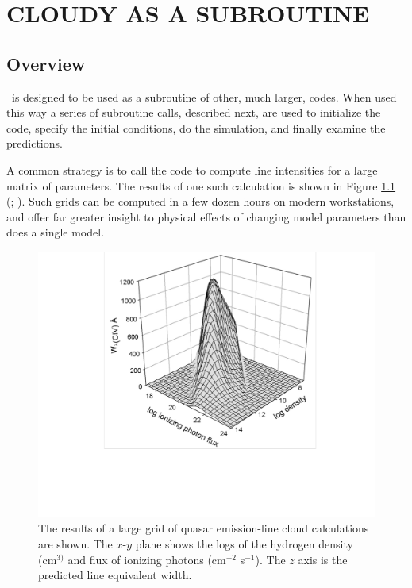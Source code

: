 \chapter{CLOUDY AS A SUBROUTINE}

\section{Overview}

\Cloudy\ is designed to be used as a subroutine of other, much larger,
codes.  When used this way a series of subroutine calls, described next,
are used to initialize the code, specify the initial conditions, do the
simulation, and finally examine the predictions.

A common strategy is to call the code to compute line intensities for
a large matrix of parameters.
The results of one such calculation is shown
in Figure \ref{fig:CIV_EW} (\citealp{Baldwin1995};
\citealp{Ferland2003}).
Such grids can be computed
in a few dozen hours on modern workstations, and offer far greater insight
to physical effects of changing model parameters than does a single model.

\begin{figure}
\centering
\includegraphics[scale=0.8]{CIV_EW}
\caption[C~IV equivalent width]{\label{fig:CIV_EW}The results of a large grid of quasar emission-line cloud
calculations are shown.  The $x$-$y$ plane shows the logs of the hydrogen density
(cm$^{3)}$ and flux of ionizing photons (cm$^{-2}$ s$^{-1}$).  The $z$ axis is the predicted
line equivalent width.}
\end{figure}

